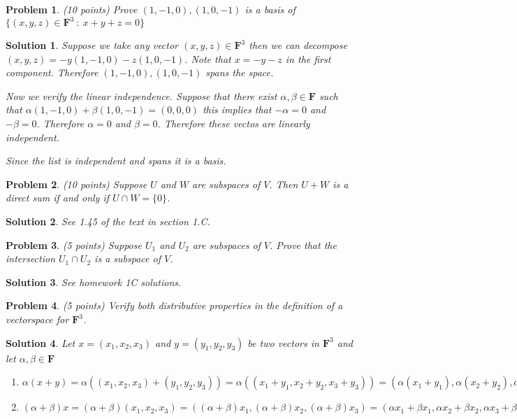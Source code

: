 \documentclass{article}
\theoremstyle{problemstyle}
\newtheorem{problem}{Problem}
\theoremstyle{problemstyle}
\newtheorem{solution}{Solution}
\theoremstyle{problemstyle}
\begin{document}
\begin{problem}
(10 points) Prove $(1,-1,0),(1,0,-1)$ is a basis of $\{(x,y,z) \in \textbf{F}^3 \ : \ x+y+z =0 \}$
\end{problem}

\begin{solution}
Suppose we take any vector $(x,y,z) \in \textbf{F}^3$ then we can decompose $(x,y,z) = -y(1,-1,0) -z(1,0,-1)$. Note that $x = -y -z$ in the first component. Therefore $(1,-1,0),(1,0,-1)$ spans the space. 

Now we verify the linear independence. Suppose that there exist $\alpha, \beta \in \textbf{F}$ such that $\alpha(1,-1,0) + \beta(1,0,-1) = (0,0,0)$ this implies that $-\alpha = 0$ and $-\beta = 0$. Therefore $\alpha = 0$ and $\beta = 0$. Therefore these vectos are linearly independent. 

Since the list is independent and spans it is a basis. 
\end{solution}

\begin{problem}
(10 points) Suppose $U$ and $W$ are subspaces of $V$. Then $U + W$ is a direct sum if and only if $U\cap W = \{0\}$.
\end{problem}

\begin{solution}
See 1.45 of the text in section 1.C.
\end{solution}

\begin{problem}
(5 points) Suppose $U_1$ and $U_2$ are subspaces of $V$. Prove that the intersection $U_1 \cap U_2$ is a subspace of $V$. 
\end{problem}

\begin{solution}
See homework 1C solutions.
\end{solution}

\begin{problem}
(5 points) Verify both distributive properties in the definition of a vectorspace for $\textbf{F}^3$.
\end{problem}

\begin{solution}
Let $x = (x_1,x_2,x_3)$ and $y = (y_1,y_2,y_3)$ be two vectors in $\textbf{F}^3$ and let $\alpha,\beta \in \textbf{F}$

\begin{enumerate}
\item $\alpha(x+y) = \alpha((x_1,x_2,x_3) + (y_1,y_2,y_3)) = \alpha((x_1 + y_1,x_2 + y_2,x_3 + y_3)) = (\alpha (x_1 + y_1), \alpha (x_2 + y_2),\alpha(x_3 + y_3)) = (\alpha x_1 + \alpha y_1), \alpha x_2 +\alpha  y_2),\alpha x_3 +\alpha  y_3) = \alpha(x_1,x_2,x_3) + \alpha(y_1,y_2,y_3) = \alpha x + \alpha y$
\item $(\alpha + \beta)x = (\alpha+\beta)(x_1,x_2,x_3) = ((\alpha+\beta)x_1,(\alpha+\beta)x_2,(\alpha+\beta)x_3) = (\alpha x_1+\beta x_1,\alpha x_2 +\beta x_2,\alpha x_3+\beta x_3) = (\alpha x_1,\alpha x_2,\alpha x_3) +(\beta x_1, \beta x_2,\beta x_3) = \alpha x + \beta x$
\end{enumerate}
\end{solution}
\end{document}
